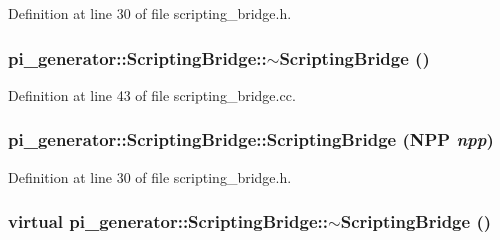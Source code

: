 Definition at line 30 of file scripting\_\-bridge.h.

\hypertarget{classpi__generator_1_1_scripting_bridge_a605567080f40ddb9a6c2fa4ea9f2e876}{
\subsubsection[{$\sim$ScriptingBridge}]{\setlength{\rightskip}{0pt plus 5cm}pi\_\-generator::ScriptingBridge::$\sim$ScriptingBridge ()}}
\label{classpi__generator_1_1_scripting_bridge_a605567080f40ddb9a6c2fa4ea9f2e876}


Definition at line 43 of file scripting\_\-bridge.cc.

\hypertarget{classpi__generator_1_1_scripting_bridge_abcc778b6a4c482dff1ed271d7e776e42}{
\subsubsection[{ScriptingBridge}]{\setlength{\rightskip}{0pt plus 5cm}pi\_\-generator::ScriptingBridge::ScriptingBridge ({\bf NPP} {\em npp})}}
\label{classpi__generator_1_1_scripting_bridge_abcc778b6a4c482dff1ed271d7e776e42}


Definition at line 30 of file scripting\_\-bridge.h.

\hypertarget{classpi__generator_1_1_scripting_bridge_a59851d3f9406541b0805b87b874a1a49}{
\subsubsection[{$\sim$ScriptingBridge}]{\setlength{\rightskip}{0pt plus 5cm}virtual pi\_\-generator::ScriptingBridge::$\sim$ScriptingBridge ()}}
\label{classpi__generator_1_1_scripting_bridge_a59851d3f9406541b0805b87b874a1a49}


